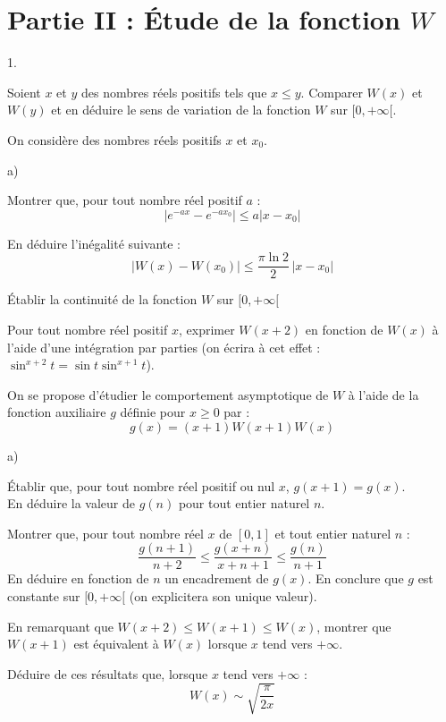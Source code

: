 \documentclass[11pt]{article}%
\begin{document}
\section*{Partie II : Étude de la fonction $W$}

\begin{noliste}{1.}
 \setlength{\itemsep}{4mm}
\item Soient $x$ et $y$ des nombres réels positifs tels que $x\leq y$.
Comparer $W(x)$ et $W(y)$ et en déduire le sens de variation de la
fonction $W$ sur $[0, + \infty \lbrack $.

\item On considère des nombres réels positifs $x$ et $x_{0}$.

\begin{noliste}{a)}
 \setlength{\itemsep}{2mm}
\item Montrer que, pour tout nombre réel positif $a$ : 
\[
\left| e^{-ax}-e^{-ax_{0}}\right| \leq a\left|
x-x_{0}\right|
\]

\item En déduire l'inégalité suivante : 
\[
\left| W(x)-W(x_{0})\right| \leq \dfrac{\pi \ln 2}{2}\,\left|
x-x_{0}\right|
\]

\item Établir la continuité de la fonction $W$ sur $[0, + \infty
\lbrack $
\end{noliste}

\item Pour tout nombre réel positif $x$, exprimer $W(x + 2)$ en
fonction de $W(x)$ à l'aide d'une intégration par parties (on écrira à
cet effet : $\sin
^{x + 2}t = \sin t\sin ^{x + 1}t$).

\item On se propose d'étudier le comportement asymptotique de $W$ à
l'aide
de la fonction auxiliaire $g$ définie pour $x\geq 0$ par : 
\[
g(x) = (x + 1)W(x + 1)W(x)
\]

\begin{noliste}{a)}
 \setlength{\itemsep}{2mm}
\item Établir que, pour tout nombre réel positif ou nul $x$, $g(x + 1)
= g(x)$.\\
En déduire la valeur de $g(n)$ pour tout entier naturel $n$.

\item Montrer que, pour tout nombre réel $x$ de $[0,1]$ et tout entier
naturel $n$ : 
\[
\dfrac{g(n + 1)}{n + 2}\leq \dfrac{g(x + n)}{x + n + 1}\leq
\dfrac{g(n)}{n + 1}
\]
En déduire en fonction de $n$ un encadrement de $g(x)$. En conclure que
$g$
est constante sur $[0, + \infty \lbrack $ (on explicitera son unique
valeur).

\item En remarquant que $W(x + 2)\leq W(x + 1)\leq W(x)$, montrer que
$W(x + 1)$ est équivalent à $W(x)$ lorsque $x$ tend vers $ + \infty $.

\item Déduire de ces résultats que, lorsque $x$ tend vers $ + \infty $
: 
\[
W(x)\sim \sqrt{\dfrac{\pi }{2x}}
\]
\end{noliste}
\end{noliste}
\end{document}
